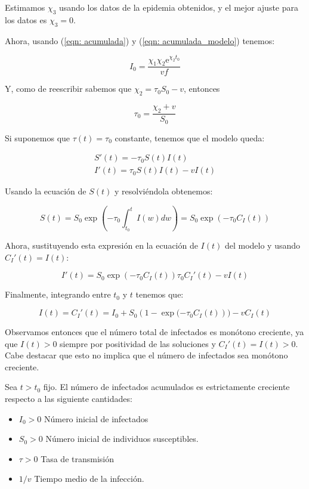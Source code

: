 Estimamos $\chi_3$ usando los datos de la epidemia obtenidos, y el mejor ajuste para los datos es $\chi_3=0$.

Ahora, usando (\ref{eqn: acumulada}) y (\ref{eqn: acumulada_modelo}) tenemos:

\begin{equation}
I_0=\frac{\chi_1\chi_2\mathrm{e}^{\chi_2 t_0}}{vf}
\end{equation}

Y, como de reescribir sabemos que $\chi_2 = \tau_0 S_0-v$, entonces

\begin{equation}
\tau_0 = \frac{\chi_2+v}{S_0}
\end{equation}

Si suponemos que $\tau (t) = \tau_0$ constante, tenemos que el modelo queda:

\begin{equation}
\begin{aligned}
S'(t) = -\tau_0S(t)I(t) \\
I'(t) = \tau_0S(t)I(t) -vI(t)
\end{aligned}
\end{equation}

Usando la ecuación de $S(t)$ y resolviéndola obtenemos:

$$S(t) = S_0\exp{\left( -\tau_0 \int_{t_0}^t I(w) dw \right)} = S_0\exp{(-\tau_0 C_I(t))}$$

Ahora, sustituyendo esta expresión en la ecuación de $I(t)$ del modelo y usando $C_I'(t)=I(t)$:

$$I'(t) = S_0\exp{\left( -\tau_0 C_I(t)\right) }\tau_0 C_I'(t)-vI(t)$$

Finalmente, integrando entre $t_0$ y $t$ tenemos que:

$$I(t)=C_I'(t)=I_0+S_0(1-\exp{(-\tau_0 C_I(t)}))-vC_I(t)$$
 
Observamos entonces que el número total de infectados es monótono creciente, ya que $I(t)>0$ siempre por positividad de las soluciones y $C_I'(t)=I(t)>0$. Cabe destacar que esto no implica que el número de infectados sea monótono creciente.

\begin{theorem}
Sea $t>t_0$ fijo. El número de infectados acumulados es estrictamente creciente respecto a las siguiente cantidades:
\begin{itemize}
\item $I_0>0$ Número inicial de infectados
\item $S_0>0$ Número inicial de individuos susceptibles.
\item $\tau>0$ Tasa de transmisión
\item $1/v$ Tiempo medio de la infección.
\end{itemize}
\end{theorem}

